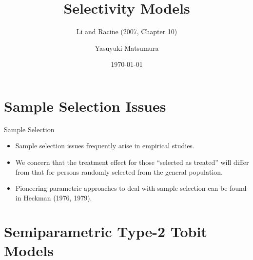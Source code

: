 \documentclass[xcolor=svgnames,dvipdfmx,cjk]{beamer}
\theoremstyle{example}
\begin{document}
 

\title{Selectivity Models} 
\subtitle{Li and Racine (2007, Chapter 10)}
\author{Yasuyuki Matsumura}
\date{\today} %

\begin{frame}                  
\titlepage            
\end{frame}



\section{Sample Selection Issues}

\begin{frame}{Sample Selection}

      \begin{itemize}
            \item Sample selection issues frequently arise in empirical studies.
            \item We concern that the treatment effect for those ``selected as treated'' 
                  will differ from that for persons randomly selected from the general population.
            \item Pioneering parametric approaches to deal with sample selection can be found in Heckman (1976, 1979).
      \end{itemize}
      
\end{frame}


\section{Semiparametric Type-2 Tobit Models}
\end{document}
